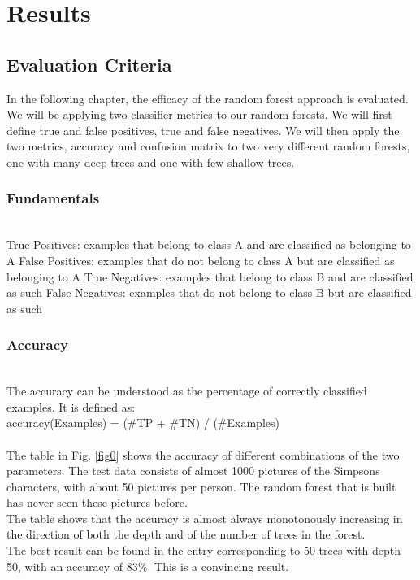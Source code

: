 \documentclass[journal, a4paper]{IEEEtran}
\begin{document}
\section{Results}

\subsection{Evaluation Criteria}
In the following  chapter, the efficacy of the random forest approach is evaluated. We will be applying two classifier metrics to our random forests. We will first define true and false positives, true and false negatives. We will then apply the two metrics, accuracy and confusion matrix to two very different random forests, one with many deep trees and one with few shallow trees.\newline

\subsubsection{Fundamentals}~\\
True Positives: examples that belong to class A and are classified as belonging to A\newline
False Positives: examples that do not belong to class A but are classified as belonging to A\newline
True Negatives: examples that belong to class B and are classified as such\newline
False Negatives: examples that do not belong to class B but are classified as such\newline


\subsubsection{Accuracy}~\\
The accuracy can be understood as the percentage of correctly classified examples. It is defined as: \newline
\\
accuracy(Examples) = (\#TP + \#TN) / (\#Examples)
\\
\\
The table in Fig. \ref{fig0} shows the accuracy of different combinations of the two parameters. The test data consists of almost 1000 pictures of the Simpsons characters, with about 50 pictures per person. The random forest that is built has never seen these pictures before.
\\
The table shows that the accuracy is almost always monotonously increasing in the direction of both the depth and of the number of trees in the forest. %
\\
The best result can be found in the entry corresponding to 50 trees with depth 50, with an accuracy of 83\%. This is a convincing result.
\\
\end{document}
